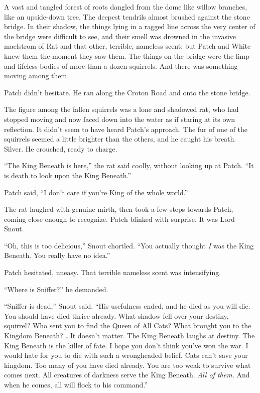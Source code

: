 \documentclass[ebook,oneside,openany,17pt]{memoir}
\newenvironment{tolerant}[1]{%
  \par\tolerance=#1\relax
}{%
  \par
}
\begin{document}
A vast and tangled forest of roots dangled from the dome like willow
branches, like an upside-down tree. The deepest tendrils almost
brushed against the stone bridge. In their shadow, the things lying in
a ragged line across the very center of the bridge were difficult to
see, and their smell was drowned in the invasive maelstrom of Rat and
that other, terrible, nameless scent; but Patch and White knew them
the moment they saw them. The things on the bridge were the limp and
lifeless bodies of more than a dozen squirrels. And there was
something moving among them.

Patch didn’t hesitate. He ran along the Croton Road and onto the stone
bridge.

The figure among the fallen squirrels was a lone and shadowed rat, who
had stopped moving and now faced down into the water as if staring at
its own reflection. It didn’t seem to have heard Patch’s approach. The
fur of one of the squirrels seemed a little brighter than the others,
and he caught his breath. Silver. He crouched, ready to charge.

“The King Beneath is here,” the rat said coolly, without looking up at
Patch. “It is death to look upon the King Beneath.”

Patch said, “I don’t care if you’re King of the whole world.”

The rat laughed with genuine mirth, then took a few steps towards
Patch, coming close enough to recognize. Patch blinked with
surprise. It was Lord Snout.

“Oh, this is too delicious,” Snout chortled. “You actually thought
\emph{I} was the King Beneath. You really have no idea.”

Patch hesitated, uneasy. That terrible nameless scent was
intensifying.

“Where is Sniffer?” he demanded.

\begin{tolerant}{1000}
“Sniffer is dead,” Snout said. “His usefulness end\-ed, and he died as
you will die. You should have died thrice already. What shadow fell
over your destiny, squirrel? Who sent you to find the Queen of All
Cats? What brought you to the Kingdom Beneath? …It doesn’t matter. The
King Beneath laughs at destiny. The King Beneath is the killer of
fate. I hope you don’t think you’ve won the war. I would hate for you
to die with such a wrongheaded belief. Cats can’t save your
kingdom. Too many of you have died already. You are too weak to
survive what comes next. All creatures of darkness serve the King
Beneath. \emph{All of them.} And when he comes, all will flock to
his command.”
\end{tolerant}
\end{document}
